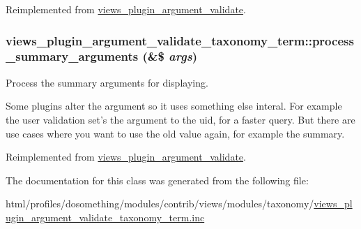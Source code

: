 Reimplemented from \hyperlink{classviews__plugin__argument__validate_aff1c9fc15ddc984fb1157f97274e3e6e}{views\_\-plugin\_\-argument\_\-validate}.\hypertarget{classviews__plugin__argument__validate__taxonomy__term_a6019c52239ae10eb1023624c2db9e24f}{
\subsubsection[{process\_\-summary\_\-arguments}]{\setlength{\rightskip}{0pt plus 5cm}views\_\-plugin\_\-argument\_\-validate\_\-taxonomy\_\-term::process\_\-summary\_\-arguments (\&\$ {\em args})}}
\label{classviews__plugin__argument__validate__taxonomy__term_a6019c52239ae10eb1023624c2db9e24f}
Process the summary arguments for displaying.

Some plugins alter the argument so it uses something else interal. For example the user validation set's the argument to the uid, for a faster query. But there are use cases where you want to use the old value again, for example the summary. 

Reimplemented from \hyperlink{classviews__plugin__argument__validate_a35ebaf052ae4653ae5134afc11883c05}{views\_\-plugin\_\-argument\_\-validate}.

The documentation for this class was generated from the following file:\begin{DoxyCompactItemize}
\item 
html/profiles/dosomething/modules/contrib/views/modules/taxonomy/\hyperlink{views__plugin__argument__validate__taxonomy__term_8inc}{views\_\-plugin\_\-argument\_\-validate\_\-taxonomy\_\-term.inc}\end{DoxyCompactItemize}
